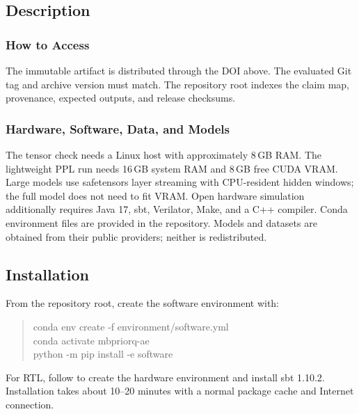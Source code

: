 \subsection{Description}
\subsubsection{How to Access}
The immutable artifact is distributed through the DOI above. The evaluated Git
tag and archive version must match. The repository root 
indexes the claim map, provenance, expected outputs, and release checksums.

\subsubsection{Hardware, Software, Data, and Models}
The tensor check needs a Linux host with approximately 8\,GB RAM. The lightweight PPL
run needs 16\,GB system RAM and 8\,GB free CUDA VRAM. Large models use
safetensors layer streaming with CPU-resident hidden windows; the full model
does not need to fit VRAM. Open hardware simulation additionally requires Java
17, sbt, Verilator, Make, and a C++ compiler. Conda environment files are
provided in the repository. Models and datasets are obtained from their public
providers; neither is redistributed.

\subsection{Installation}
From the repository root, create the software environment with:
\begin{quote}\small\ttfamily
conda env create -f environment/software.yml\\
conda activate mbpriorq-ae\\
python -m pip install -e software
\end{quote}
For RTL, follow  to create the hardware environment
and install sbt 1.10.2. Installation takes about 10--20 minutes with a normal
package cache and Internet connection.

